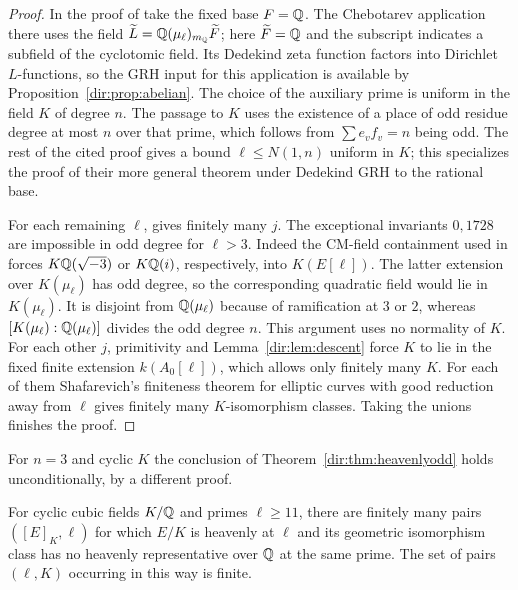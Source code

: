 \begin{proof}
In the proof of \cite[Theorem~5.3]{RasmussenTamagawa2017Arithmetic} take the fixed base
$F=\mathbb{Q}$. The Chebotarev application there uses the field
$\widetilde L=\mathbb{Q}(\mu_\ell)_{m_{\mathbb{Q}}}\widetilde F$; here $\widetilde F=\mathbb{Q}$ and the
subscript indicates a subfield of the cyclotomic field. Its Dedekind zeta function
factors into Dirichlet $L$-functions, so the GRH input for this application is
available by Proposition~\ref{dir:prop:abelian}. The choice of the auxiliary prime is uniform in
the field $K$ of degree $n$. The passage to $K$ uses the existence of a place of odd
residue degree at most $n$ over that prime, which follows from $\sum e_vf_v=n$ being
odd. The rest of the cited proof gives a bound $\ell\le N(1,n)$ uniform in $K$; this
specializes the proof of their more general theorem under Dedekind GRH to the rational
base.

For each remaining $\ell$, \cite[Theorem~3.1]{McLemanRasmussen2026Heavenly} gives
finitely many $j$. The exceptional invariants $0,1728$ are impossible in odd degree
for $\ell>3$. Indeed the CM-field containment used in
\cite[Lemma~5.1]{OHara2026Heavenly} forces $K\mathbb{Q}(\sqrt{-3})$ or $K\mathbb{Q}(i)$, respectively,
into $K(E[\ell])$. The latter extension over $K(\mu_\ell)$ has odd degree, so the
corresponding quadratic field would lie in $K(\mu_\ell)$. It is disjoint from
$\mathbb{Q}(\mu_\ell)$ because of ramification at $3$ or $2$, whereas
$[K(\mu_\ell):\mathbb{Q}(\mu_\ell)]$ divides the odd degree $n$. This argument uses no
normality of $K$. For each other $j$, primitivity and Lemma~\ref{dir:lem:descent} force $K$
to lie in the fixed finite extension $k(A_0[\ell])$, which allows only finitely many
$K$. For each of them Shafarevich's finiteness theorem for elliptic curves with good
reduction away from $\ell$ gives finitely many $K$-isomorphism classes. Taking the
unions finishes the proof.
\end{proof}

For $n=3$ and cyclic $K$ the conclusion of Theorem~\ref{dir:thm:heavenlyodd} holds
unconditionally, by a different proof.

\begin{theorem}\label{dir:thm:ohara}
For cyclic cubic fields $K/\mathbb{Q}$ and primes $\ell\ge11$, there are finitely many pairs
$([E]_K,\ell)$ for which $E/K$ is heavenly at $\ell$ and its geometric isomorphism
class has no heavenly representative over $\mathbb{Q}$ at the same prime. The set of pairs
$(\ell,K)$ occurring in this way is finite.
\end{theorem}

